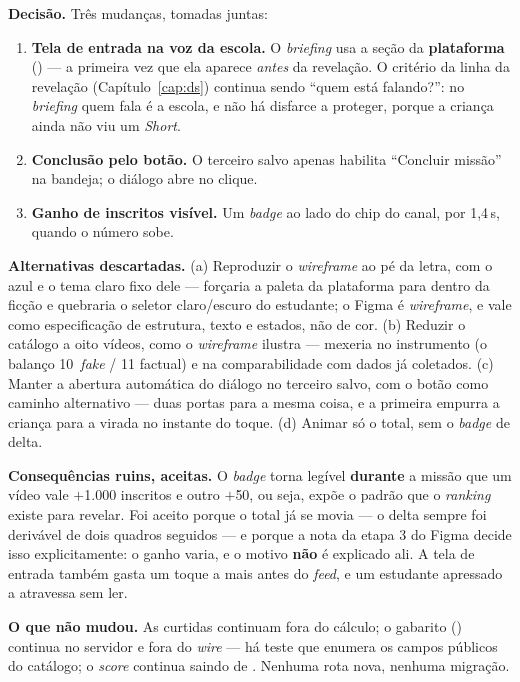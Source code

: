 \textbf{Decisão.} Três mudanças, tomadas juntas:

\begin{enumerate}
  \item \textbf{Tela de entrada na voz da escola.} O \emph{briefing} usa a seção
    da \textbf{plataforma} () --- a primeira vez que ela aparece
    \emph{antes} da revelação. O critério da linha da revelação
    (Capítulo~\ref{cap:ds}) continua sendo \enquote{quem está falando?}: no
    \emph{briefing} quem fala é a escola, e não há disfarce a proteger, porque a
    criança ainda não viu um \emph{Short}.
  \item \textbf{Conclusão pelo botão.} O terceiro salvo apenas habilita
    \enquote{Concluir missão} na bandeja; o diálogo abre no clique.
  \item \textbf{Ganho de inscritos visível.} Um \emph{badge}  ao lado do
    chip do canal, por 1,4\,s, quando o número sobe.
\end{enumerate}

\textbf{Alternativas descartadas.} (a) Reproduzir o \emph{wireframe} ao pé da
letra, com o azul e o tema claro fixo dele --- forçaria a paleta da plataforma
para dentro da ficção e quebraria o seletor claro/escuro do estudante; o Figma é
\emph{wireframe}, e vale como especificação de estrutura, texto e estados, não de
cor. (b) Reduzir o catálogo a oito vídeos, como o \emph{wireframe} ilustra ---
mexeria no instrumento (o balanço 10~\emph{fake} / 11 factual) e na
comparabilidade com dados já coletados. (c) Manter a abertura automática do
diálogo no terceiro salvo, com o botão como caminho alternativo --- duas portas
para a mesma coisa, e a primeira empurra a criança para a virada no instante do
toque. (d) Animar só o total, sem o \emph{badge} de delta.

\textbf{Consequências ruins, aceitas.} O \emph{badge} torna legível
\textbf{durante} a missão que um vídeo vale $+$1.000 inscritos e outro $+$50, ou
seja, expõe o padrão que o \emph{ranking} existe para revelar. Foi aceito porque
o total já se movia --- o delta sempre foi derivável de dois quadros seguidos ---
e porque a nota da etapa 3 do Figma decide isso explicitamente: o ganho varia, e
o motivo \textbf{não} é explicado ali. A tela de entrada também gasta um toque a
mais antes do \emph{feed}, e um estudante apressado a atravessa sem ler.

\textbf{O que não mudou.} As curtidas continuam fora do cálculo; o gabarito
() continua no servidor e fora do \emph{wire} --- há teste que
enumera os campos públicos do catálogo; o \emph{score} continua saindo de
. Nenhuma rota nova, nenhuma migração.

